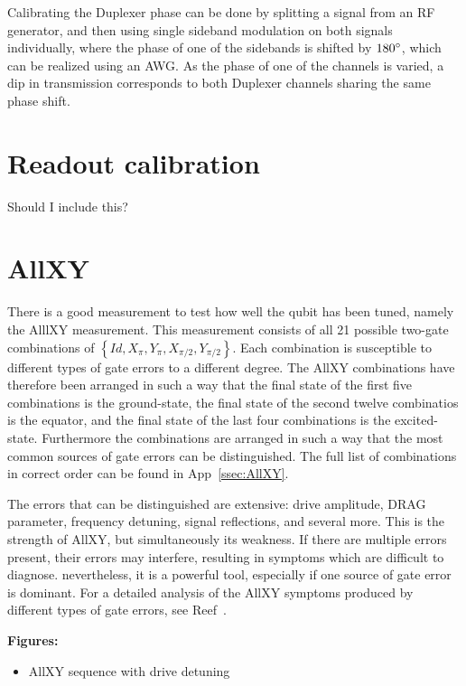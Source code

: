       Calibrating the Duplexer phase can be done by splitting a signal from an RF generator, and then using single sideband modulation on both signals individually, where the phase of one of the sidebands is shifted by $180 \degree$, which can be realized using an AWG. As the phase of one of the channels is varied, a dip in transmission corresponds to both Duplexer channels sharing the same phase shift.

    \section{Readout calibration}
      \label{sec:Readout calibration}
      Should I include this?

    \section{AllXY}
      \label{sec:AllXY}
        There is a good measurement to test how well the qubit has been tuned, namely the AlllXY measurement. This measurement consists of all 21 possible two-gate combinations of $\left\{Id, X_{\pi}, Y_{\pi}, X_{\pi/2}, Y_{\pi/2}\right\}$. Each combination is susceptible to different types of gate errors to a different degree. The AllXY combinations have therefore been arranged in such a way that the final state of the first five combinations is the ground-state, the final state of the second twelve combinatios is the equator, and the final state of the last four combinations is the excited-state. Furthermore the combinations are arranged in such a way that the most common sources of gate errors can be distinguished. The full list of combinations in correct order can be found in App~\ref{ssec:AllXY}.

        The errors that can be distinguished are extensive: drive amplitude, DRAG parameter, frequency detuning, signal reflections, and several more. This is the strength of AllXY, but simultaneously its weakness. If there are multiple errors present, their errors may interfere, resulting in symptoms which are difficult to diagnose. nevertheless, it is a powerful tool, especially if one source of gate error is dominant. For a detailed analysis of the AllXY symptoms produced by different types of gate errors, see Reef~\cite{Reed}.

        \textbf{Figures:}
        \begin{itemize}
          \item AllXY sequence with drive detuning
        \end{itemize}

